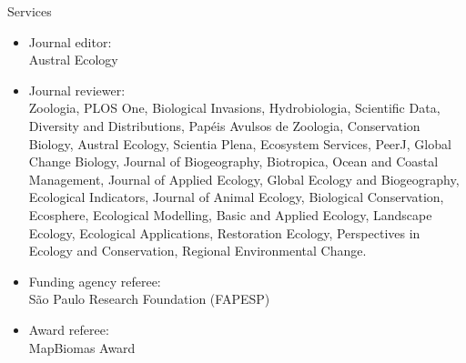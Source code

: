 \documentclass{resume}
\begin{document}
\begin{rSection}{Services}
\begin{itemize}
\item Journal editor:\\
Austral Ecology

\item Journal reviewer:\\
Zoologia, PLOS One, Biological Invasions, Hydrobiologia, Scientific Data, Diversity and Distributions, Papéis Avulsos de Zoologia, Conservation Biology, Austral Ecology, Scientia Plena, Ecosystem Services, PeerJ, Global Change Biology, Journal of Biogeography, Biotropica, Ocean and Coastal Management, Journal of Applied Ecology, Global Ecology and Biogeography, Ecological Indicators, Journal of Animal Ecology, Biological Conservation, Ecosphere, Ecological Modelling, Basic and Applied Ecology, Landscape Ecology, Ecological Applications, Restoration Ecology, Perspectives in Ecology and Conservation, Regional Environmental Change.

\item Funding agency referee:\\
São Paulo Research Foundation (FAPESP)

\item Award referee:\\
MapBiomas Award
\end{itemize}
\end{rSection}

\end{document}
